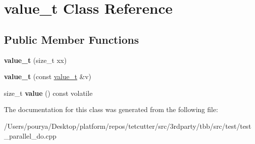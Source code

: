 \hypertarget{classvalue__t}{}\section{value\+\_\+t Class Reference}
\label{classvalue__t}
\subsection*{Public Member Functions}
\begin{DoxyCompactItemize}
\item 
\hypertarget{classvalue__t_a9715134dc5f48d2fe99904fda8aad8ad}{}{\bfseries value\+\_\+t} (size\+\_\+t xx)\label{classvalue__t_a9715134dc5f48d2fe99904fda8aad8ad}

\item 
\hypertarget{classvalue__t_a5e8dc7b3fdf11ba68716d977d6efbba5}{}{\bfseries value\+\_\+t} (const \hyperlink{classvalue__t}{value\+\_\+t} \&v)\label{classvalue__t_a5e8dc7b3fdf11ba68716d977d6efbba5}

\item 
\hypertarget{classvalue__t_a0ec7d89e044f9e1d3c9d152f47b0d566}{}size\+\_\+t {\bfseries value} () const  volatile\label{classvalue__t_a0ec7d89e044f9e1d3c9d152f47b0d566}

\end{DoxyCompactItemize}


The documentation for this class was generated from the following file\+:\begin{DoxyCompactItemize}
\item 
/\+Users/pourya/\+Desktop/platform/repos/tetcutter/src/3rdparty/tbb/src/test/test\+\_\+parallel\+\_\+do.\+cpp\end{DoxyCompactItemize}
